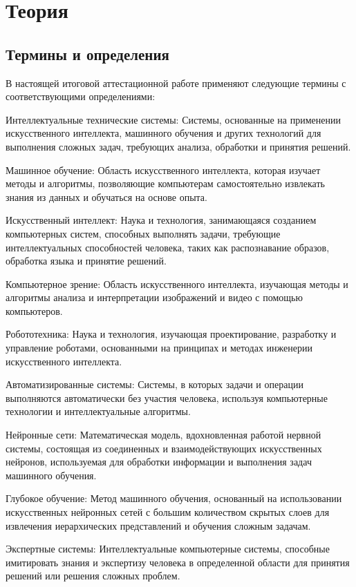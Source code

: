 \chapter{Теория}
\label{ch:theory}

    \section{Термины и определения}
    В настоящей итоговой аттестационной работе применяют следующие термины с соответствующими определениями:
    
    Интеллектуальные технические системы: Системы, основанные на применении искусственного интеллекта, машинного обучения и других технологий для выполнения сложных задач, требующих анализа, обработки и принятия решений.
    
    Машинное обучение: Область искусственного интеллекта, которая изучает методы и алгоритмы, позволяющие компьютерам самостоятельно извлекать знания из данных и обучаться на основе опыта.
    
    Искусственный интеллект: Наука и технология, занимающаяся созданием компьютерных систем, способных выполнять задачи, требующие интеллектуальных способностей человека, таких как распознавание образов, обработка языка и принятие решений.
    
    Компьютерное зрение: Область искусственного интеллекта, изучающая методы и алгоритмы анализа и интерпретации изображений и видео с помощью компьютеров.
    
    Робототехника: Наука и технология, изучающая проектирование, разработку и управление роботами, основанными на принципах и методах инженерии искусственного интеллекта.
    
    Автоматизированные системы: Системы, в которых задачи и операции выполняются автоматически без участия человека, используя компьютерные технологии и интеллектуальные алгоритмы.
    
    Нейронные сети: Математическая модель, вдохновленная работой нервной системы, состоящая из соединенных и взаимодействующих искусственных нейронов, используемая для обработки информации и выполнения задач машинного обучения.
    
    Глубокое обучение: Метод машинного обучения, основанный на использовании искусственных нейронных сетей с большим количеством скрытых слоев для извлечения иерархических представлений и обучения сложным задачам.
    
    Экспертные системы: Интеллектуальные компьютерные системы, способные имитировать знания и экспертизу человека в определенной области для принятия решений или решения сложных проблем.
    
